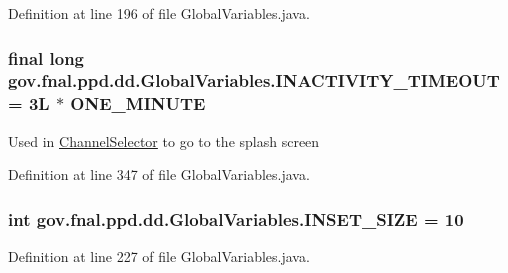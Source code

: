 Definition at line 196 of file Global\-Variables.\-java.

\hypertarget{classgov_1_1fnal_1_1ppd_1_1dd_1_1GlobalVariables_ab33d116e6a83d46d778ee5c3521a39a4}{
\subsubsection[{I\-N\-A\-C\-T\-I\-V\-I\-T\-Y\-\_\-\-T\-I\-M\-E\-O\-U\-T}]{\setlength{\rightskip}{0pt plus 5cm}final long gov.\-fnal.\-ppd.\-dd.\-Global\-Variables.\-I\-N\-A\-C\-T\-I\-V\-I\-T\-Y\-\_\-\-T\-I\-M\-E\-O\-U\-T = 3\-L $\ast$ O\-N\-E\-\_\-\-M\-I\-N\-U\-T\-E\hspace{0.3cm}{\ttfamily [static]}}}\label{classgov_1_1fnal_1_1ppd_1_1dd_1_1GlobalVariables_ab33d116e6a83d46d778ee5c3521a39a4}
Used in \hyperlink{classgov_1_1fnal_1_1ppd_1_1dd_1_1ChannelSelector}{Channel\-Selector} to go to the splash screen 

Definition at line 347 of file Global\-Variables.\-java.

\hypertarget{classgov_1_1fnal_1_1ppd_1_1dd_1_1GlobalVariables_a938952f27836544cbcf8eed0fceecb99}{
\subsubsection[{I\-N\-S\-E\-T\-\_\-\-S\-I\-Z\-E}]{\setlength{\rightskip}{0pt plus 5cm}int gov.\-fnal.\-ppd.\-dd.\-Global\-Variables.\-I\-N\-S\-E\-T\-\_\-\-S\-I\-Z\-E = 10\hspace{0.3cm}{\ttfamily [static]}}}\label{classgov_1_1fnal_1_1ppd_1_1dd_1_1GlobalVariables_a938952f27836544cbcf8eed0fceecb99}


Definition at line 227 of file Global\-Variables.\-java.

